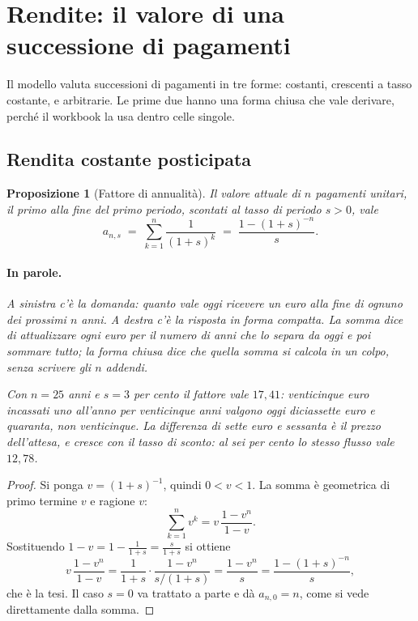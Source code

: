 \documentclass[11pt,a4paper]{article}
\theoremstyle{definition}
\theoremstyle{plain}
\newtheorem{proposizione}[definizione]{Proposizione}
\begin{document}
\section{Rendite: il valore di una successione di pagamenti}

Il modello valuta successioni di pagamenti in tre forme: costanti, crescenti a tasso costante, e arbitrarie. Le prime due hanno una forma chiusa che vale derivare, perché il workbook la usa dentro celle singole.

\subsection{Rendita costante posticipata}

\begin{proposizione}[Fattore di annualità]
Il valore attuale di $n$ pagamenti unitari, il primo alla fine del primo periodo, scontati al tasso di periodo $s>0$, vale
\begin{equation}
a_{n,s} \;=\; \sum_{k=1}^{n} \frac{1}{(1+s)^k} \;=\; \frac{1-(1+s)^{-n}}{s} .
\label{eq:annualita}
\end{equation}

\paragraph{In parole.} A sinistra c'è la domanda: quanto vale oggi ricevere un euro alla fine di ognuno dei prossimi $n$ anni. A destra c'è la risposta in forma compatta. La somma dice di attualizzare ogni euro per il numero di anni che lo separa da oggi e poi sommare tutto; la forma chiusa dice che quella somma si calcola in un colpo, senza scrivere gli $n$ addendi.

Con $n = 25$ anni e $s = 3$ per cento il fattore vale $17{,}41$: venticinque euro incassati uno all'anno per venticinque anni valgono oggi diciassette euro e quaranta, non venticinque. La differenza di sette euro e sessanta è il prezzo dell'attesa, e cresce con il tasso di sconto: al sei per cento lo stesso flusso vale $12{,}78$.
\end{proposizione}

\begin{proof}
Si ponga $v = (1+s)^{-1}$, quindi $0<v<1$. La somma è geometrica di primo termine $v$ e ragione $v$:
\[
\sum_{k=1}^{n} v^k = v\,\frac{1-v^n}{1-v} .
\]
Sostituendo $1-v = 1-\frac{1}{1+s} = \frac{s}{1+s}$ si ottiene
\[
v\,\frac{1-v^n}{1-v} = \frac{1}{1+s}\cdot\frac{1-v^n}{s/(1+s)} = \frac{1-v^n}{s} = \frac{1-(1+s)^{-n}}{s},
\]
che è la tesi. Il caso $s=0$ va trattato a parte e dà $a_{n,0}=n$, come si vede direttamente dalla somma.
\end{proof}
\end{document}
